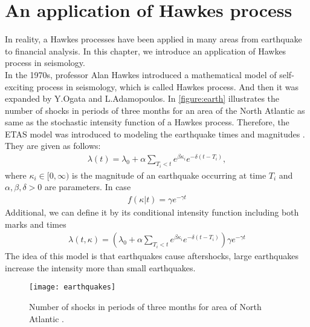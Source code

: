 \chapter{An application of Hawkes process}
\label{chapter:application}
In reality, a Hawkes processes have been applied in many areas from earthquake to financial analysis. In this chapter, we introduce an application of Hawkes process in seismology.\\
In the 1970s, professor Alan Hawkes introduced a mathematical model of self-exciting process in seismology, which is called Hawkes process. And then it was expanded by Y.Ogata and L.Adamopoulos. In \autoref{figure:earth} illustrates the number of shocks in periods of three months for an area of the North Atlantic as same as the stochastic intensity function of a Hawkes process. Therefore, the ETAS model was introduced to modeling the earthquake times and magnitudes \cite{thesis}. They are given as follows:
\begin{align*}
	\lambda(t) = \lambda_0 + \alpha \sum_{T_i < t}e^{\beta \kappa_i}e^{-\delta(t - T_i)},
\end{align*}
where $\kappa_i \in [0, \infty)$ is the magnitude of an earthquake occurring at time $T_i$ and $\alpha , \beta, \delta > 0$ are parameters. In case 
\begin{align*}
	f(\kappa| t) = \gamma e^{-\gamma t}
\end{align*}
Additional, we can define it by its conditional intensity function including both marks and times
\begin{align*}
	\lambda(t, \kappa) = (\lambda_0 + \alpha \sum_{T_i < t}e^{\beta \kappa_i}e^{-\delta(t - T_i)})\gamma e^{-\gamma t}
\end{align*}  
The idea of this model is that earthquakes cause aftershocks, large earthquakes increase the intensity more than small earthquakes. 
\begin{figure}[H]
	\centering
	\texttt{[image: earthquakes]}
	\caption[Number of shocks in periods of three months for area of North Atlantic.]{Number of shocks in periods of three months for area of North Atlantic \cite{thesis}.}
	\label{figure:earth}
\end{figure}